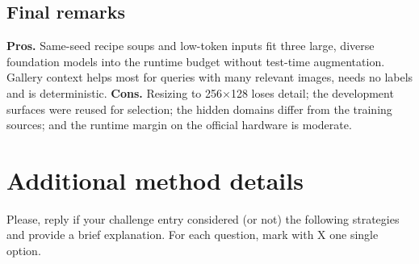 \documentclass[a4paper, 10pt, conference]{ieeeconf}
\begin{document}
\subsection{Final remarks}
\textbf{Pros.} Same-seed recipe soups and low-token inputs fit three large, diverse foundation models into the runtime budget without test-time augmentation. Gallery context helps most for queries with many relevant images, needs no labels and is deterministic.
\textbf{Cons.} Resizing to 256$\times$128 loses detail; the development surfaces were reused for selection; the hidden domains differ from the training sources; and the runtime margin on the official hardware is moderate.

\section{Additional method details}
Please, reply if your challenge entry considered (or not) the following strategies and provide a brief explanation. For each question, mark with X one single option. \\
\end{document}
